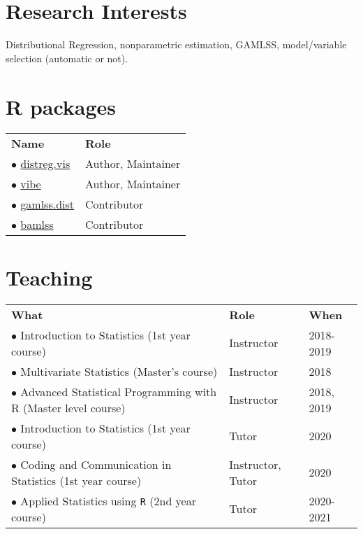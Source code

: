 \documentclass[a4paper,10pt]{article} %
\begin{document}
\section{Research Interests}
Distributional Regression, nonparametric estimation, GAMLSS, model/variable selection (automatic or not).

\section{R packages}
\begin{tabular}{ll}
	\textbf{Name} & \textbf{Role} \\
	$\bullet$ \href{https://cran.r-project.org/web/packages/distreg.vis/index.html}{distreg.vis} & Author, Maintainer \\
	$\bullet$ \href{https://github.com/Stan125/vibe}{vibe} & Author, Maintainer \\
$\bullet$ \href{https://cran.r-project.org/web/packages/gamlss.dist/index.html}{gamlss.dist} & Contributor \\
$\bullet$ \href{https://cran.r-project.org/web/packages/bamlss/index.html}{bamlss} & Contributor \\
\end{tabular}

\section{Teaching}
\begin{tabular}{lll}
\textbf{What} & \textbf{Role} & \textbf{When} \\
$\bullet$ Introduction to Statistics (1st year course) & Instructor & 2018-2019 \\
$\bullet$ Multivariate Statistics (Master's course)& Instructor & 2018 \\
$\bullet$ Advanced Statistical Programming with R (Master level course) & Instructor & 2018, 2019 \\
$\bullet$ Introduction to Statistics (1st year course) & Tutor & 2020 \\
$\bullet$ Coding and Communication in Statistics (1st year course) & Instructor, Tutor & 2020 \\
$\bullet$ Applied Statistics using \texttt{R} (2nd year course) & Tutor & 2020-2021 \\
\end{tabular}
\end{document}
